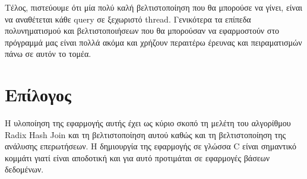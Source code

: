 \documentclass[12pt, a4paper]{article}
\begin{document}
Τέλος, πιστεύουμε ότι μία πολύ καλή βελτιστοποίηση που θα μπορούσε να γίνει, είναι να αναθέτεται κάθε query σε ξεχωριστό thread. Γενικότερα τα επίπεδα πολυνηματισμού και βελτιστοποιήσεων που θα μπορούσαν να εφαρμοστούν στο πρόγραμμά μας είναι πολλά ακόμα και χρήζουν περαιτέρω έρευνας και πειραματισμών πάνω σε αυτόν το τομέα. \\

\section{Επίλογος}

Η υλοποίηση της εφαρμογής αυτής έχει ως κύριο σκοπό τη μελέτη του αλγορίθμου Radix Hash Join και τη βελτιστοποίηση αυτού καθώς και τη βελτιστοποίηση της ανάλυσης επερωτήσεων. Η δημιουργία της εφαρμογής σε γλώσσα C είναι σημαντικό κομμάτι γιατί είναι αποδοτική και για αυτό προτιμάται σε εφαρμογές βάσεων δεδομένων.
\end{document}

